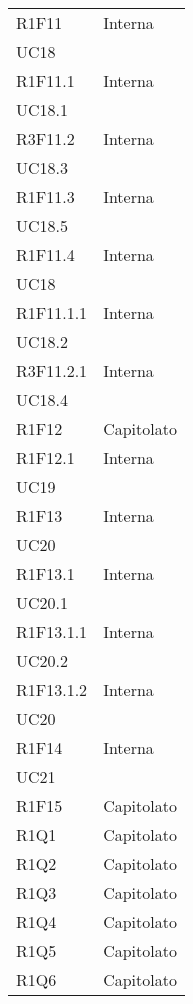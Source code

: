 \begin{longtable}{|C{6.5cm}|C{6.5cm}|}
	R1F11 & \centering Interna \\ UC18 \tabularnewline

	R1F11.1 &  \centering Interna \\ UC18.1 \tabularnewline

	R3F11.2 & \centering Interna \\ UC18.3 \tabularnewline

	R1F11.3 & \centering Interna \\ UC18.5 \tabularnewline

	R1F11.4 & \centering Interna \\ UC18 \tabularnewline

	R1F11.1.1 & \centering Interna \\ UC18.2 \tabularnewline

	R3F11.2.1 & \centering Interna \\ UC18.4 \tabularnewline

	R1F12 &   Capitolato \\

	R1F12.1 & \centering Interna \\ UC19 \tabularnewline

	R1F13 & \centering Interna \\ UC20 \tabularnewline

	R1F13.1 & \centering Interna \\ UC20.1 \tabularnewline

	R1F13.1.1 & \centering Interna \\ UC20.2 \tabularnewline

	R1F13.1.2 & \centering Interna \\ UC20 \tabularnewline

	R1F14 & \centering Interna \\ UC21 \tabularnewline

	R1F15 & Capitolato \\

	R1Q1 & Capitolato \\

	R1Q2 & Capitolato \\

	R1Q3 & Capitolato \\

	R1Q4 & Capitolato \\

	R1Q5 & Capitolato \\

	R1Q6 & Capitolato \\


\end{longtable}
